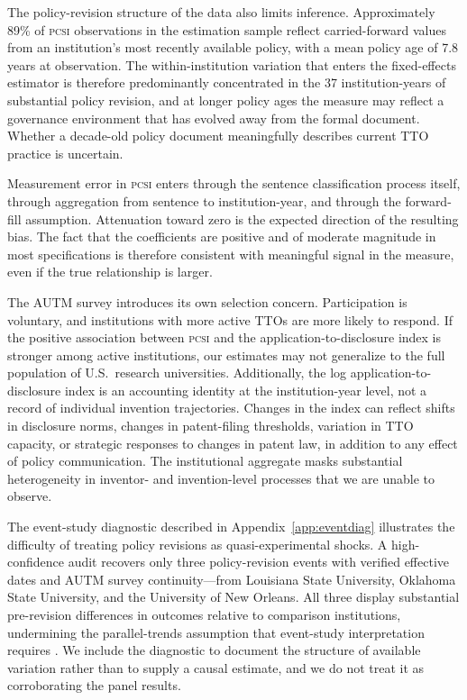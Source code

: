\documentclass[12pt]{article}
\newcommand{\PCSI}{\textsc{pcsi}}
\begin{document}
The policy-revision structure of the data also limits inference. Approximately 89\%
of \PCSI{} observations in the estimation sample reflect carried-forward values from
an institution's most recently available policy, with a mean policy age of 7.8 years
at observation. The within-institution variation that enters the fixed-effects estimator
is therefore predominantly concentrated in the 37 institution-years of substantial
policy revision, and at longer policy ages the measure may reflect a governance
environment that has evolved away from the formal document. Whether a decade-old policy
document meaningfully describes current TTO practice is uncertain.

Measurement error in \PCSI{} enters through the sentence classification process
itself, through aggregation from sentence to institution-year, and through the
forward-fill assumption. Attenuation toward zero is the expected direction of the
resulting bias. The fact that the coefficients are positive and of moderate magnitude
in most specifications is therefore consistent with meaningful signal in the measure,
even if the true relationship is larger.

The AUTM survey introduces its own selection concern. Participation is voluntary,
and institutions with more active TTOs are more likely to respond. If the positive
association between \PCSI{} and the application-to-disclosure index is stronger among
active institutions, our estimates may not generalize to the full population of U.S.\
research universities. Additionally, the log application-to-disclosure index is an
accounting identity at the institution-year level, not a record of individual invention
trajectories. Changes in the index can reflect shifts in disclosure norms, changes in
patent-filing thresholds, variation in TTO capacity, or strategic responses to changes
in patent law, in addition to any effect of policy communication. The institutional
aggregate masks substantial heterogeneity in inventor- and invention-level processes
that we are unable to observe.

The event-study diagnostic described in Appendix~\ref{app:eventdiag} illustrates
the difficulty of treating policy revisions as quasi-experimental shocks. A
high-confidence audit recovers only three policy-revision events with verified
effective dates and AUTM survey continuity---from Louisiana State University, Oklahoma
State University, and the University of New Orleans. All three display substantial
pre-revision differences in outcomes relative to comparison institutions, undermining
the parallel-trends assumption that event-study interpretation requires \citep{callaway2021,
roth2022, rambachanroth2023}. We include the diagnostic to document the structure of
available variation rather than to supply a causal estimate, and we do not treat it
as corroborating the panel results.
\end{document}
